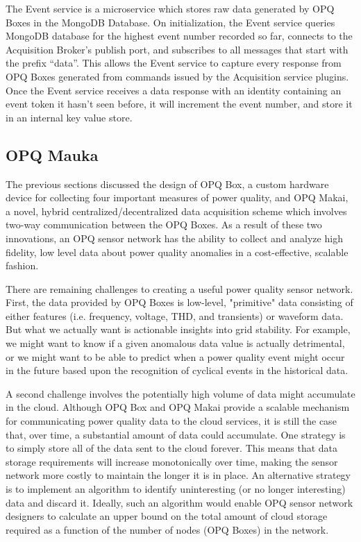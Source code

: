 The Event service is a microservice which stores raw data generated by OPQ Boxes in the MongoDB Database. On initialization, the Event service queries MongoDB database for the highest event number recorded so far, connects to the Acquisition Broker’s publish port, and subscribes to all messages that start with the prefix ``data”. This allows the Event service to capture every response from OPQ Boxes generated from commands issued by the Acquisition service plugins. Once the Event service receives a data response with an identity containing an event token it hasn’t seen before, it will increment the event number, and store it in an internal key value store.

\subsection{OPQ Mauka}
\label{sec:opq-mauka}

The previous sections discussed the design of OPQ Box, a custom hardware device for collecting four important measures of power quality, and OPQ Makai, a novel, hybrid centralized/decentralized data acquisition scheme which involves two-way communication between the OPQ Boxes.  As a result of these two innovations, an OPQ sensor network has the ability to collect and analyze high fidelity, low level data about power quality anomalies in a cost-effective, scalable fashion.

There are remaining challenges to creating a useful power quality sensor network. First, the data provided by OPQ Boxes is low-level, "primitive" data consisting of either features (i.e. frequency, voltage, THD, and transients) or waveform data. But what we actually want is actionable insights into grid stability. For example, we might want to know if a given anomalous data value is actually detrimental, or we might want to be able to predict when a power quality event might occur in the future based upon the recognition of cyclical events in the historical data.

A second challenge involves the potentially high volume of data might accumulate in the cloud. Although OPQ Box and OPQ Makai provide a scalable mechanism for communicating power quality data to the cloud services, it is still the case that, over time, a substantial amount of data could accumulate. One strategy is to simply store all of the data sent to the cloud forever. This means that data storage requirements will increase monotonically over time, making the sensor network more costly to maintain the longer it is in place. An alternative strategy is to implement an algorithm to identify uninteresting (or no longer interesting) data and discard it.  Ideally, such an algorithm would enable OPQ sensor network designers to calculate an upper bound on the total amount of cloud storage required as a function of the number of nodes (OPQ Boxes) in the network.


